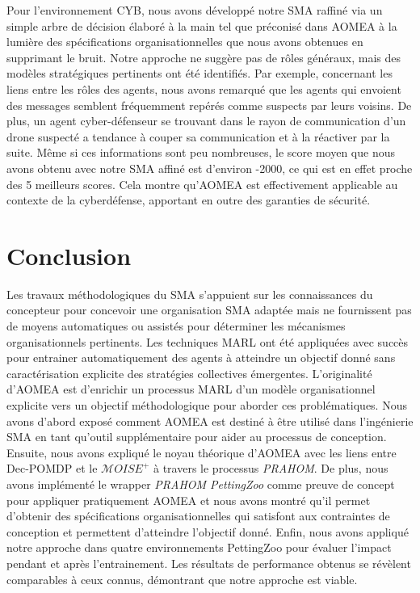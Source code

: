 \documentclass[contribution]{jfsma}
\begin{document}
Pour l'environnement CYB, nous avons développé notre SMA raffiné via un simple arbre de décision élaboré à la main tel que préconisé dans AOMEA à la lumière des spécifications organisationnelles que nous avons obtenues en supprimant le bruit. Notre approche ne suggère pas de rôles généraux, mais des modèles stratégiques pertinents ont été identifiés. Par exemple, concernant les liens entre les rôles des agents, nous avons remarqué que les agents qui envoient des messages semblent fréquemment repérés comme suspects par leurs voisins. De plus, un agent cyber-défenseur se trouvant dans le rayon de communication d’un drone suspecté a tendance à couper sa communication et à la réactiver par la suite. Même si ces informations sont peu nombreuses, le score moyen que nous avons obtenu avec notre SMA affiné est d'environ -2000, ce qui est en effet proche des 5 meilleurs scores. Cela montre qu'AOMEA est effectivement applicable au contexte de la cyberdéfense, apportant en outre des garanties de sécurité.

\section{Conclusion}

Les travaux méthodologiques du SMA s'appuient sur les connaissances du concepteur pour concevoir une organisation SMA adaptée mais ne fournissent pas de moyens automatiques ou assistés pour déterminer les mécanismes organisationnels pertinents.
Les techniques MARL ont été appliquées avec succès pour entrainer automatiquement des agents à atteindre un objectif donné sans caractérisation explicite des stratégies collectives émergentes.
L'originalité d'AOMEA est d'enrichir un processus MARL d'un modèle organisationnel explicite vers un objectif méthodologique pour aborder ces problématiques. Nous avons d'abord exposé comment AOMEA est destiné à être utilisé dans l'ingénierie SMA en tant qu'outil supplémentaire pour aider au processus de conception.
Ensuite, nous avons expliqué le noyau théorique d'AOMEA avec les liens entre Dec-POMDP et le $\mathcal{M}OISE^+$ à travers le processus \emph{PRAHOM}.
De plus, nous avons implémenté le wrapper \emph{PRAHOM PettingZoo} comme preuve de concept pour appliquer pratiquement AOMEA et nous avons montré qu'il permet d'obtenir des spécifications organisationnelles qui satisfont aux contraintes de conception et permettent d'atteindre l'objectif donné.
Enfin, nous avons appliqué notre approche dans quatre environnements PettingZoo pour évaluer l'impact pendant et après l'entrainement. Les résultats de performance obtenus se révèlent comparables à ceux connus, démontrant que notre approche est viable.
\end{document}
